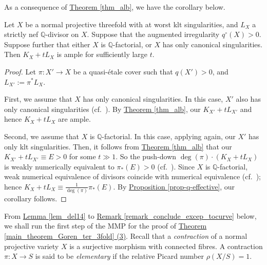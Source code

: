 As a consequence of {\hyperref[thm_alb]{Theorem   \ref*{thm_alb}}}, we have the corollary below. 
\begin{cor}\label{coro_q0>0}
Let $X$ be a  normal projective threefold with at worst klt singularities, and $L_X$ a strictly nef $\mathbb{Q}$-divisor on $X$.
Suppose that the augmented irregularity $q^\circ(X)>0$.
Suppose further that either $X$ is $\mathbb{Q}$-factorial, or $X$ has only canonical singularities.
Then $K_X+tL_X$ is ample for sufficiently large $t$.
\end{cor}



\begin{proof}
Let $\pi:X'\to X$ be a quasi-\'etale cover such that $q(X')>0$, and $L_{X'}:=\pi^*L_X$.

First, we assume that $X$ has only canonical singularities. 
In this case, $X'$ also has only canonical singularities (cf.~\cite[Proposition 5.20]{KM98}).
By {\hyperref[thm_alb]{Theorem   \ref*{thm_alb}}}, our $K_{X'}+tL_{X'}$ and hence $K_X+tL_X$ are ample.

Second, we assume that $X$ is $\mathbb{Q}$-factorial.
In this case, applying \cite[Proposition 5.20]{KM98} again, our $X'$  has only klt singularities. 
Then, it follows from {\hyperref[thm_alb]{Theorem   \ref*{thm_alb}}} that our $K_{X'}+tL_{X'}\equiv E>0$ for some $t\gg 1$. 
So the push-down $\deg(\pi)\cdot(K_X+tL_X)$ is weakly numerically equivalent to $\pi_*(E)>0$ (cf.~\cite[Definition 2.2]{MZ18}). 
Since $X$ is $\mathbb{Q}$-factorial, weak numerical equivalence of divisors coincide with numerical equivalence (cf.~\cite[Lemma 3.2]{Zha16}); hence $K_X+tL_X\equiv \frac{1}{\deg(\pi)}\pi_*(E)$. 
By {\hyperref[prop-q-effective]{Proposition  \ref*{prop-q-effective}}}, our corollary follows.
\end{proof}



From {\hyperref[lem_del14]{Lemma  \ref*{lem_del14}}} to {\hyperref[remark_conclude_excep_tocurve]{Remark     \ref*{remark_conclude_excep_tocurve}}} below, 
we shall run the first step of the MMP for the proof of {\hyperref[main_theorem_Goren_ter_3fold]{Theorem   \ref*{main_theorem_Goren_ter_3fold} (3)}}.  
Recall that a \textit{contraction} of a  normal projective variety $X$ is a surjective morphism with connected fibres.
A contraction $\pi:X\to S$ is said to be \textit{elementary} if the relative Picard number $\rho(X/S)=1$.

